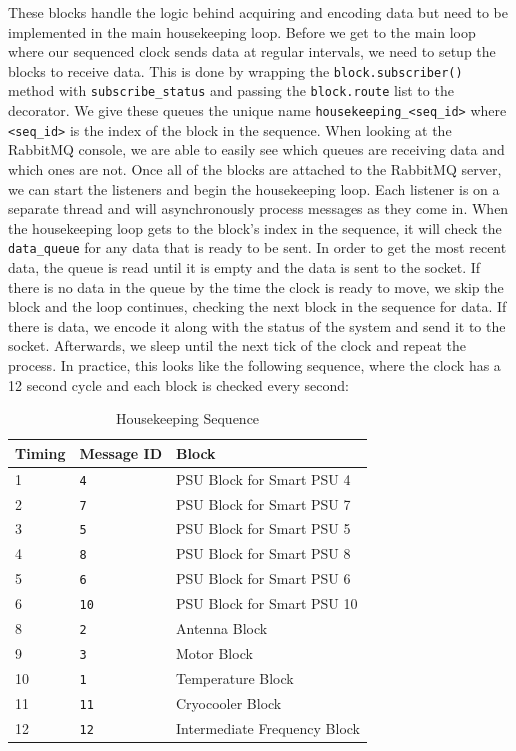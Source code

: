 These blocks handle the logic behind acquiring and encoding data but need to be implemented in the main housekeeping loop.
Before we get to the main loop where our sequenced clock sends data at regular intervals, we need to setup the blocks to receive data. 
This is done by wrapping the \texttt{block.subscriber()} method with \texttt{subscribe\_status} and passing the \texttt{block.route} list to the decorator.
We give these queues the unique name \texttt{housekeeping\_<seq\_id>} where \texttt{<seq\_id>} is the index of the block in the sequence.
When looking at the RabbitMQ console, we are able to easily see which queues are receiving data and which ones are not.
Once all of the blocks are attached to the RabbitMQ server, we can start the listeners and begin the housekeeping loop.
Each listener is on a separate thread and will asynchronously process messages as they come in.
When the housekeeping loop gets to the block's index in the sequence, it will check the \texttt{data\_queue} for any data that is ready to be sent.
In order to get the most recent data, the queue is read until it is empty and the data is sent to the socket.
If there is no data in the queue by the time the clock is ready to move, we skip the block and the loop continues, checking the next block in the sequence for data. 
If there is data, we encode it along with the status of the system and send it to the socket.
Afterwards, we sleep until the next tick of the clock and repeat the process.
In practice, this looks like the following sequence, where the clock has a 12 second cycle and each block is checked every second:
\begin{table}
    \centering
    \begin{tabularx}{\textwidth}{l|l|X}
        \textbf{Timing} & \textbf{Message ID} & \textbf{Block} \\
        \hline
        1 &\texttt{4} & PSU Block for Smart PSU 4 \\
        2 &\texttt{7} & PSU Block for Smart PSU 7 \\
        3 &\texttt{5} & PSU Block for Smart PSU 5 \\
        4 &\texttt{8} & PSU Block for Smart PSU 8 \\
        5 &\texttt{6} & PSU Block for Smart PSU 6 \\
        6 &\texttt{10} & PSU Block for Smart PSU 10 \\
        8 &\texttt{2} & Antenna Block \\
        9 & \texttt{3} & Motor Block \\
        10 & \texttt{1} & Temperature Block \\
        11 & \texttt{11} & Cryocooler Block \\
        12 & \texttt{12} & Intermediate Frequency Block \\
    \end{tabularx}
    \caption{Housekeeping Sequence}
    \label{readout/table:housekeeping_sequence}
\end{table}

